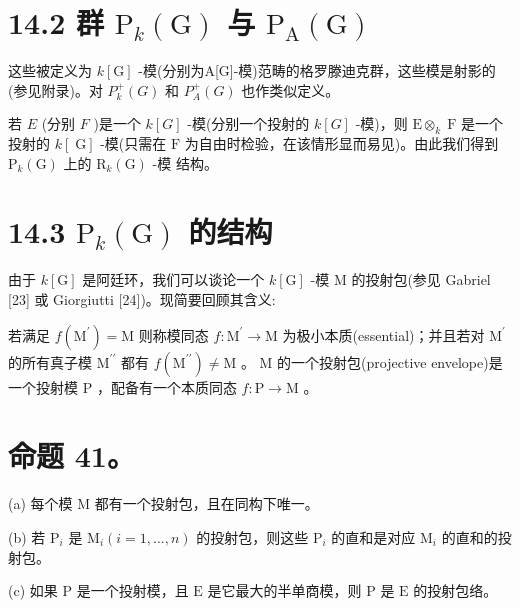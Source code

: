 \documentclass[10pt]{article}
\begin{document}
\section*{14.2 群 \({\mathrm{P}}_{k}\left( \mathrm{G}\right)\) 与 \({\mathrm{P}}_{\mathrm{A}}\left( \mathrm{G}\right)\)}

这些被定义为 \(k\left\lbrack  \mathrm{G}\right\rbrack\) -模(分别为A[G]-模)范畴的格罗滕迪克群，这些模是射影的(参见附录)。对 \({P}_{k}^{ + }\left( G\right)\) 和 \({P}_{A}^{ + }\left( G\right)\) 也作类似定义。

若 \(E\) (分别 \(F\) )是一个 \(k\left\lbrack  G\right\rbrack\) -模(分别一个投射的 \(k\left\lbrack  G\right\rbrack\) -模)，则 \(\mathrm{E}{ \otimes  }_{k}\mathrm{\;F}\) 是一个投射的 \(k\left\lbrack  \mathrm{\;G}\right\rbrack\) -模(只需在 \(\mathrm{F}\) 为自由时检验，在该情形显而易见)。由此我们得到 \({\mathrm{P}}_{k}\left( \mathrm{G}\right)\) 上的 \({\mathrm{R}}_{k}\left( \mathrm{G}\right)\) -模 结构。

\section*{14.3 \({\mathrm{P}}_{k}\left( \mathrm{G}\right)\) 的结构}

由于 \(k\left\lbrack  \mathrm{G}\right\rbrack\) 是阿廷环，我们可以谈论一个 \(k\left\lbrack  \mathrm{G}\right\rbrack\) -模 M 的投射包(参见 Gabriel [23] 或 Giorgiutti [24])。现简要回顾其含义:

若满足 \(f\left( {\mathrm{M}}^{\prime }\right)  = \mathrm{M}\) 则称模同态 \(f : {\mathrm{M}}^{\prime } \rightarrow  \mathrm{M}\) 为极小本质(essential)；并且若对 \({\mathrm{M}}^{\prime }\) 的所有真子模 \({\mathrm{M}}^{\prime \prime }\) 都有 \(f\left( {\mathrm{M}}^{\prime \prime }\right)  \neq  \mathrm{M}\) 。 \(\mathrm{M}\) 的一个投射包(projective envelope)是一个投射模 \(\mathrm{P}\) ，配备有一个本质同态 \(f : \mathrm{P} \rightarrow  \mathrm{M}\) 。

\section*{命题 41。}

(a) 每个模 \(\mathrm{M}\) 都有一个投射包，且在同构下唯一。

(b) 若 \({\mathrm{P}}_{i}\) 是 \({\mathrm{M}}_{i}\left( {i = 1,\ldots ,n}\right)\) 的投射包，则这些 \({\mathrm{P}}_{i}\) 的直和是对应 \({\mathrm{M}}_{i}\) 的直和的投射包。

(c) 如果 \(\mathrm{P}\) 是一个投射模，且 \(\mathrm{E}\) 是它最大的半单商模，则 \(\mathrm{P}\) 是 \(\mathrm{E}\) 的投射包络。
\end{document}

